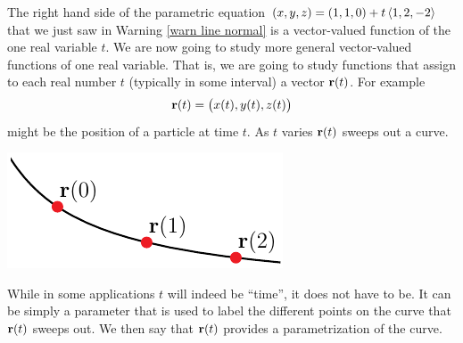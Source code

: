 The right hand side of the parametric equation 
 $(x,y,z)=(1,1,0)+t\left< 1,2,-2\right>$ that we just saw in Warning 
\ref{warn line normal} is a vector-valued function of the one real 
variable $t$.
We are now going to study more general vector-valued functions of one 
real variable. That is, we are going to study functions that assign to 
each real number $t$ (typically in some interval) a vector $\mathbf{r}(t)$. 
For example
\begin{equation*}
\mathbf{r}(t) = \big( x(t), y(t), z(t)\big)
\end{equation*}
might be the position of a particle at time $t$. As $t$ varies
$\mathbf{r}(t)$ sweeps out a curve.
\begin{efig}
\begin{center}
     \includegraphics{parCurve.pdf}
\end{center}
\end{efig}
While in some applications $t$ will indeed be ``time'', it does not
have to be. It can be simply a parameter that is used to label the
different points on the curve that $\mathbf{r}(t)$ sweeps out. We then say 
that $\mathbf{r}(t)$ provides a parametrization of the curve.

